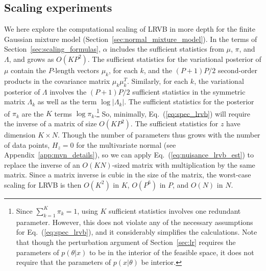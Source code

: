 \documentclass{article}\usepackage[]{graphicx}\usepackage[]{color}
\newcommand{\app}[1]{Appendix~\ref{app:#1}}
\newcommand{\mysec}[1]{Section~\ref{sec:#1}}
\newcommand{\eq}[1]{Eq.~(\ref{eq:#1})}
\theoremstyle{plain}
\begin{document}
\subsection{Scaling experiments} \label{sec:gmm_scaling}



We here explore the computational scaling of LRVB in more depth
for the finite Gaussian mixture model (\mysec{normal_mixture_model}).
In the terms of \mysec{scaling_formulas}, $\alpha$
includes the sufficient statistics from $\mu$, $\pi$, and $\Lambda$,
and grows as $O(KP^2)$.
The sufficient statistics for the variational posterior of
$\mu$ contain the $P$-length vectors $\mu_k$, for each
$k$, and the $(P + 1) P / 2$ second-order products
in the covariance matrix $\mu_k \mu_k^T$.  Similarly, for each $k$,
the variational posterior of $\Lambda$ involves the
$(P + 1) P / 2$ sufficient statistics in the symmetric matrix
$\Lambda_k$ as well as the term $\log |\Lambda_k|$.  The
sufficient statistics for the posterior of $\pi_k$ are the $K$
terms $\log \pi_k$.\footnote{Since $\sum_{k=1}^{K} \pi_k = 1$, using $K$
sufficient statistics involves one redundant parameter.
However, this does not violate any of the necessary assumptions
for \eq{spec_lrvb}, and it considerably simplifies the calculations.
Note that though the perturbation argument of \mysec{lr}
requires the parameters of
$p(\theta | x)$ to be in the interior of the feasible space,
it does not require that the parameters of $p(x | \theta)$
be interior.}
So, minimally, \eq{spec_lrvb}
will require the inverse of a matrix of size $O(KP^2)$.
%
The sufficient statistics for
$z$ have dimension $K \times N$.  Though
the number of parameters thus grows with the number of
data points, $H_{z}=0$ for the multivariate normal
(see \app{mvn_details}),
so we can apply \eq{nuisance_lrvb_est} to replace the
inverse of an $O(KN)$-sized matrix with multiplication by the same matrix.
%
Since a matrix inverse is cubic in the size of the matrix,
the worst-case scaling for LRVB is then $O(K^2)$ in $K$,
$O(P^6)$ in $P$, and $O(N)$ in $N$.
\end{document}

